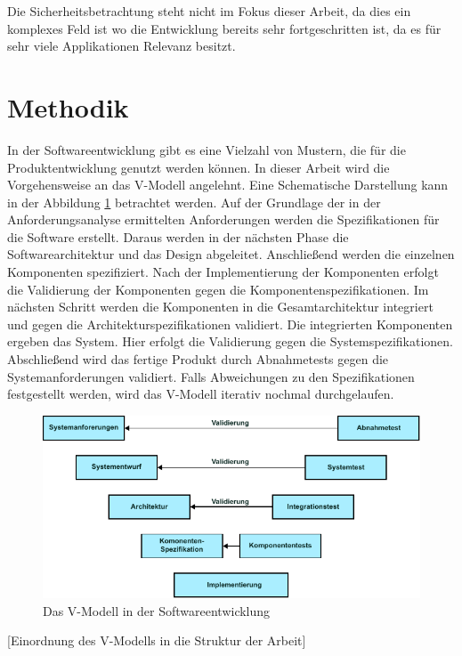 Die Sicherheitsbetrachtung steht nicht im Fokus dieser Arbeit, da dies ein komplexes Feld ist wo die Entwicklung bereits sehr fortgeschritten ist, da es für sehr viele Applikationen Relevanz besitzt. 

\section{Methodik}

In der Softwareentwicklung gibt es eine Vielzahl von Mustern, die für die Produktentwicklung genutzt werden können. \cite{Bass2012} In dieser Arbeit wird die Vorgehensweise an das V-Modell angelehnt. Eine Schematische Darstellung kann in der Abbildung \ref{v-model} betrachtet werden. Auf der Grundlage der in der Anforderungsanalyse ermittelten Anforderungen werden die Spezifikationen für die Software erstellt. Daraus werden in der nächsten Phase die Softwarearchitektur und das Design abgeleitet. Anschließend werden die einzelnen Komponenten spezifiziert. Nach der Implementierung der Komponenten erfolgt die Validierung der Komponenten gegen die Komponentenspezifikationen. Im nächsten Schritt werden die Komponenten in die Gesamtarchitektur integriert und gegen die Architekturspezifikationen validiert. Die integrierten Komponenten ergeben das System. Hier erfolgt die Validierung gegen die Systemspezifikationen. Abschließend wird das fertige Produkt durch Abnahmetests gegen die Systemanforderungen validiert. Falls Abweichungen zu den Spezifikationen festgestellt werden, wird das V-Modell iterativ nochmal durchgelaufen. 

\begin{figure}[htbp]
	\centering
	\includegraphics[width=\textwidth]{./content/graphics/V-model.pdf}
	\caption{Das V-Modell in der Softwareentwicklung}
	\label{v-model}
\end{figure}

[Einordnung des V-Modells in die Struktur der Arbeit]

